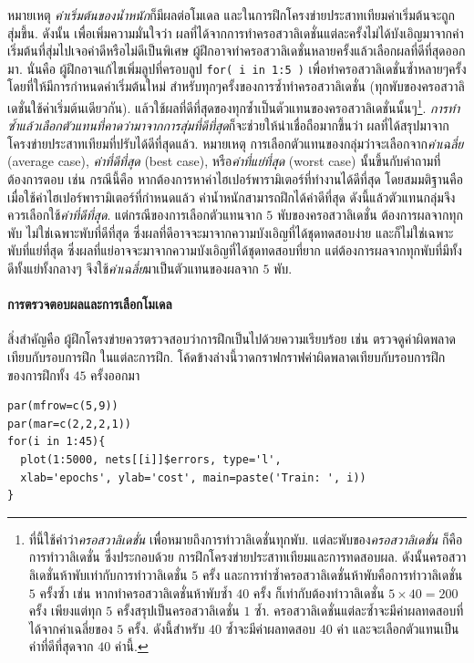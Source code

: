หมายเหตุ \textit{ค่าเริ่มต้นของน้ำหนัก}ก็มีผลต่อโมเดล และในการฝึกโครงข่ายประสาทเทียมค่าเริ่มต้นจะถูกสุ่มขึ้น.
ดังนั้น เพื่อเพิ่มความมั่นใจว่า ผลที่ได้จากการทำครอสวาลิเดชั่นแต่ละครั้งไม่ได้บังเอิญมาจากค่าเริ่มต้นที่สุ่มไปเจอค่าดีหรือไม่ดีเป็นพิเศษ 
ผู้ฝึกอาจทำครอสวาลิเดชั่นหลายครั้งแล้วเลือกผลที่ดีที่สุดออกมา.
นั่นคือ 
ผู้ฝึกอาจแก้ไขเพิ่มลูปที่ครอบลูป \texttt{for( i in 1:5 )} เพื่อทำครอสวาลิเดชั่นซ้ำหลายๆครั้ง
โดยที่ให้มีการกำหนดค่าเริ่มต้นใหม่ สำหรับทุกๆครั้งของการซ้ำทำครอสวาลิเดชั่น%
 (ทุกพับของครอสวาลิเดชั่นใช้ค่าเริ่มต้นเดียวกัน).
แล้วใช้ผลที่ดีที่สุดของทุกซ้ำเป็นตัวแทนของครอสวาลิเดชั่นนั้นๆ\footnote{
ที่นี้ใช้คำว่า\textit{ครอสวาลิเดชั่น} เพื่อหมายถึงการทำวาลิเดชั่นทุกพับ.
แต่ละพับของ\textit{ครอสวาลิเดชั่น} ก็คือการทำวาลิเดชั่น ซึ่งประกอบด้วย
การฝึกโครงข่ายประสาทเทียมและการทดสอบผล.
ดังนั้นครอสวาลิเดชั่นห้าพับเท่ากับการทำวาลิเดชั่น $5$ ครั้ง
และการทำซ้ำครอสวาลิเดชั่นห้าพับคือการทำวาลิเดชั่น $5$ ครั้งซ้ำ
เช่น หากทำครอสวาลิเดชั่นห้าพับซ้ำ $40$ ครั้ง ก็เท่ากับต้องทำวาลิเดชั่น $5 \times 40 = 200$ ครั้ง
เพียงแต่ทุก $5$ ครั้งสรุปเป็นครอสวาลิเดชั่น $1$ ซ้ำ.
ครอสวาลิเดชั่นแต่ละซ้ำจะมีค่าผลทดสอบที่ได้จากค่าเฉลี่ยของ $5$ ครั้ง.
ดังนี้สำหรับ $40$ ซ้ำจะมีค่าผลทดสอบ $40$ ค่า
และจะเลือกตัวแทนเป็นค่าที่ดีที่สุดจาก $40$ ค่านี้.
}.
\textit{การทำซ้ำแล้วเลือกตัวแทนที่คาดว่ามาจากการสุ่มที่ดีที่สุด}ก็จะช่วยให้น่าเชื่อถือมากขึ้นว่า 
ผลที่ได้สรุปมาจากโครงข่ายประสาทเทียมที่ปรับได้ดีที่สุดแล้ว.
หมายเหตุ การเลือกตัวแทนของกลุ่มว่าจะเลือกจาก\textit{ค่าเฉลี่ย} (average case), \textit{ค่าที่ดีที่สุด} (best case), หรือ\textit{ค่าที่แย่ที่สุด} (worst case) นั้นขึ้นกับคำถามที่ต้องการตอบ
เช่น กรณีนี้คือ หากต้องการหาค่าไฮเปอร์พารามิเตอร์ที่ทำงานได้ดีที่สุด 
โดยสมมติฐานคือ เมื่อใช้ค่าไฮเปอร์พารามิเตอร์ที่กำหนดแล้ว ค่าน้ำหนักสามารถฝึกได้ค่าดีที่สุด
ดังนี้แล้วตัวแทนกลุ่มจึงควรเลือกใช้\textit{ค่าที่ดีที่สุด}.
แต่กรณีของการเลือกตัวแทนจาก $5$ พับของครอสวาลิเดชั่น ต้องการผลจากทุกพับ ไม่ใช่เฉพาะพับที่ดีที่สุด ซึ่งผลที่ดีอาจจะมาจากความบังเอิญที่ได้ชุดทดสอบง่าย
และก็ไม่ใช่เฉพาะพับที่แย่ที่สุด ซึ่งผลที่แย่อาจจะมาจากความบังเอิญที่ได้ชุดทดสอบที่ยาก 
แต่ต้องการผลจากทุกพับที่มีทั้งดีทั้งแย่ทั้งกลางๆ จึงใช้\textit{ค่าเฉลี่ย}มาเป็นตัวแทนของผลจาก $5$ พับ.

\paragraph{การตรวจตอบผลและการเลือกโมเดล}
สิ่งสำคัญคือ ผู้ฝึกโครงข่ายควรตรวจสอบว่าการฝึกเป็นไปด้วยความเรียบร้อย เช่น ตรวจดูค่าผิดพลาดเทียบกับรอบการฝึก ในแต่ละการฝึก.
โค้ดข้างล่างนี้วาดกราฟกราฟค่าผิดพลาดเทียบกับรอบการฝึก ของการฝึกทั้ง $45$ ครั้งออกมา
\begin{verbatim}
par(mfrow=c(5,9))
par(mar=c(2,2,2,1))
for(i in 1:45){
  plot(1:5000, nets[[i]]$errors, type='l', 
  xlab='epochs', ylab='cost', main=paste('Train: ', i))
}
\end{verbatim}

